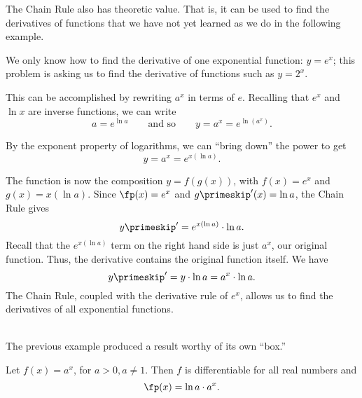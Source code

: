 
The Chain Rule also has theoretic value. That is, it can be used to find the derivatives of functions that we have not yet learned as we do in the following example.\\

{We only know how to find the derivative of one exponential function: $y = e^x$; this problem is asking us to find the derivative of functions such as $y = 2^x$. 

This can be accomplished by rewriting $a^x$ in terms of $e$.  Recalling that $e^x$ and $\ln x$ are inverse functions, we can write
\[a = e^{\ln a} \qquad \text{and so} \qquad y = a^x = e^{\ln (a^x)}.\]

By the exponent property of logarithms, we can ``bring down'' the power to get 
\[y = a^x = e^{x (\ln a)}.\]

The function is now the composition $y=f(g(x))$, with $f(x) = e^x$ and $g(x) = x(\ln a)$.  Since $\fp(x) = e^x$ and $g\primeskip'(x) = \ln a$, the Chain Rule  gives 
\[y\primeskip' = e^{x (\ln a)} \cdot \ln a.\]
Recall that the $e^{x(\ln a)}$ term on the right hand side is just $a^x$, our original function. Thus, the derivative contains the original function itself. We have
\[y\primeskip' = y \cdot \ln a = a^x\cdot \ln a.\]
The Chain Rule, coupled with the derivative rule of $e^x$, allows us to find the derivatives of all exponential functions.}\\

The previous example produced a result worthy of its own ``box.''

{Let $f(x)=a^x$, for $a>0, a\neq 1$. Then $f$ is differentiable for all real numbers and \[\fp(x) = \ln a\cdot a^x.\]}


